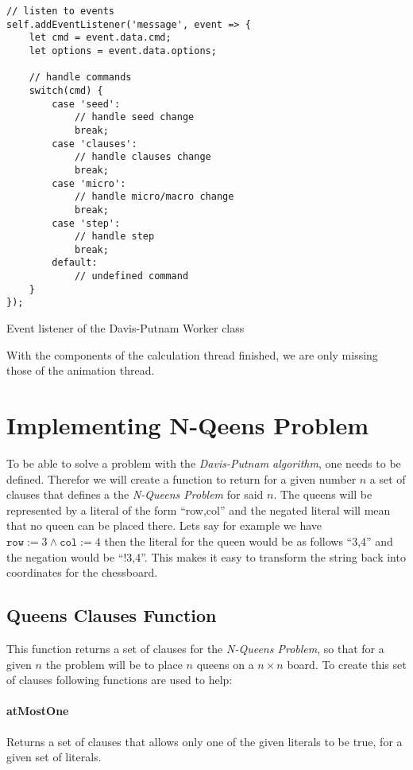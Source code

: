 \begin{listing}[h!]
\begin{verbatim}
// listen to events
self.addEventListener('message', event => {
    let cmd = event.data.cmd;
    let options = event.data.options;

    // handle commands
    switch(cmd) {
        case 'seed':
            // handle seed change
            break;
        case 'clauses':
            // handle clauses change
            break;
        case 'micro':
            // handle micro/macro change
            break;
        case 'step':
            // handle step
            break;
        default:
            // undefined command
    }
});
\end{verbatim}
    \caption{Event listener of the Davis-Putnam Worker class}
    \label{code:workerListener}
\end{listing}

With the components of the calculation thread finished, we are only missing those of the animation thread.

\section{Implementing N-Qeens Problem}
\label{sec:impQueens}
To be able to solve a problem with the \textit{Davis-Putnam algorithm}, one needs to be defined. Therefor we will create a function to return for a given number $n$ a set of clauses that defines a the \textit{N-Queens Problem} for said $n$. The queens will be represented by a literal of the form ``row,col'' and the negated literal will mean that no queen can be placed there. Lets say for example we have $\texttt{row} := 3 \land \texttt{col} := 4$ then the literal for the queen would be as follows ``3,4'' and the negation would be ``!3,4''. This makes it easy to transform the string back into coordinates for the chessboard.

\subsection{Queens Clauses Function}
\label{sub:impQueensClauses}
This function returns a set of clauses for the \textit{N-Queens Problem}, so that for a given $n$ the problem will be to place $n$ queens on a $n \times n$ board. To create this set of clauses following functions are used to help:

\paragraph{atMostOne}
Returns a set of clauses that allows only one of the given literals to be true, for a given set of literals.

